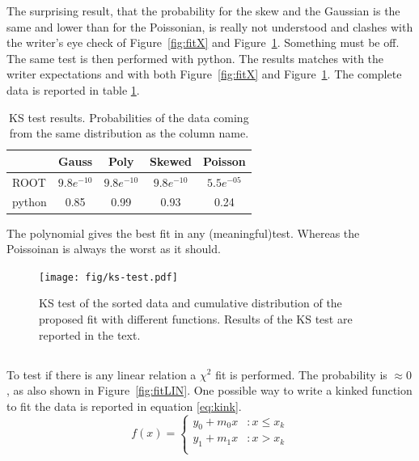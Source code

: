 \documentclass[twocolumn]{article}
\begin{document}
		The surprising result, that the probability for the skew and the Gaussian is the same and lower than for the Poissonian, is really not understood and clashes with the writer's eye check of Figure~\ref{fig:fitX} and Figure~\ref{fig:test}.
		Something must be off. 
		The same test is then performed  with python. The results matches with the writer expectations and with  both Figure~\ref{fig:fitX} and Figure~\ref{fig:test}.
		The complete data is reported in table \ref{tab:tests}.
		\begin{table}[tb]
			\caption{KS test results. Probabilities  of the data  coming from the same distribution as the column name.}
			\label{tab:tests}
			\begin{center}
				\begin{tabular}{l|cccc}
				\hline
		
				\hline
				\textbf{} & \textbf{Gauss} & \textbf{Poly} &  \textbf{Skewed} & \textbf{Poisson} \\
				\hline
				ROOT	& $9.8e^{-10 }$& $9.8e^{-10 }$  &  $9.8e^{-10 }$  & $5.5e^{-05}$ \\
				python	 & 0.85  & 0.99   & 0.93 & 0.24   \\
				\hline
		
				\hline
				\end{tabular}
			\end{center}
		\end{table}

			The polynomial gives  the best fit in any (meaningful)test. Whereas the Poissoinan is always the worst as it should.

		\begin{figure}[h!]
			\begin{center}
				\texttt{[image: fig/ks-test.pdf]}
			\end{center}
			\caption{KS test of the sorted data and cumulative distribution of the proposed fit with different functions. Results  of the KS test are reported in the text.}
			\label{fig:test}
		\end{figure}

	\subsection{}
	\label{subs:randommea}
		To test if there is any linear relation a $\chi^2$ fit is performed. The probability is $\approx 0 $, as also shown in Figure~\ref{fig:fitLIN}.
		One possible way to write a kinked function to fit the data is reported in equation \ref{eq:kink}.
		\begin{equation}
		\label{eq:kink}
			  f(x) = \left\{
		     \begin{array}{lr}
		       y_0 + m_0 x  & : x \le x_k \\
		       y_1 + m_1 x  & : x > x_k \\
		     \end{array}
		   \right.
		\end{equation}
\end{document}

